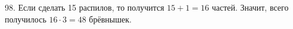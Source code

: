 98. Если сделать 15 распилов, то получится $15+1=16$ частей. Значит, всего получилось $16\cdot3=48$ брёвнышек.\\
